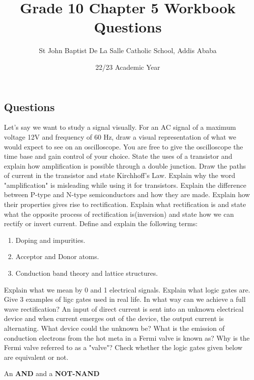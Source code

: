 \documentclass[12pt,addpoints]{exam}
\author{St John Baptist De La Salle Catholic School, Addis Ababa}
\date{22/23 Academic Year}
\begin{document}
	\title{Grade 10 Chapter 5 Workbook Questions}
	\maketitle
	
	\begin{center}
		\subsection*{Questions}
	\end{center}
	\begin{questions}
	\question Let's say we want to study a signal visually. For an AC signal of a maximum voltage 12V and frequency of 60 Hz, draw a visual representation of what we would expect to see on an oscilloscope. You are free to give the oscilloscope the time base and gain control of your choice.
	\question State the uses of a transistor and explain how amplification is possible through a double junction. Draw the paths of current in the transistor and state Kirchhoff's Law. Explain why the word "amplification" is misleading while using it for transistors.
	\question Explain the difference between P-type and N-type semiconductors and how they are made. Explain how their properties gives rise to rectification. Explain what rectification is and state what the opposite process of rectification is(inversion) and state how we can rectify or invert current.
	\question Define and explain the following terms:
	\begin{enumerate}[label=(\roman*)]
		\item  Doping and impurities.
		\item  Acceptor and Donor atoms.
		\item  Conduction band theory and lattice structures.
	\end{enumerate}
	\question Explain what we mean by 0 and 1 electrical signals. Explain what logic gates are. Give 3 examples of ligc gates used in real life.
	\question In what way can we achieve a full wave rectification?
	\question An input of direct current is sent into an unknown electrical device and when current emerges out of the device, the output current is alternating. What device could the unknown be?
	\question What is the emission of conduction electrons from the hot meta in a Fermi valve is known as?
	\question Why is the Fermi valve referred to as a "valve"?
	\question Check whether the logic gates given below are equivalent or not.
	\begin{choices}
		\choice An \textbf{AND} and a \textbf{NOT-NAND}

\end{choices}
\end{questions}
\end{document}
